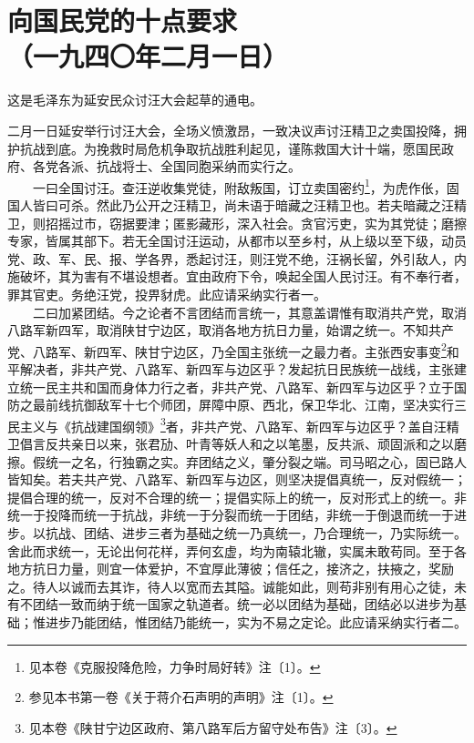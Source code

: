 \documentclass[cn,11pt,chinese]{elegantbook}
\def\myformat#1{\hfil\hfil #1}
\begin{document}
\newpage\section*{\myformat{向国民党的十点要求}\\\myformat{（一九四〇年二月一日）}}
\begin{introduction}\item  这是毛泽东为延安民众讨汪大会起草的通电。\end{introduction}
二月一日延安举行讨汪大会，全场义愤激昂，一致决议声讨汪精卫之卖国投降，拥护抗战到底。为挽救时局危机争取抗战胜利起见，谨陈救国大计十端，愿国民政府、各党各派、抗战将士、全国同胞采纳而实行之。\\
　　一曰全国讨汪。查汪逆收集党徒，附敌叛国，订立卖国密约\footnote[1]{ 见本卷《克服投降危险，力争时局好转》注〔1〕。}，为虎作伥，固国人皆曰可杀。然此乃公开之汪精卫，尚未语于暗藏之汪精卫也。若夫暗藏之汪精卫，则招摇过市，窃据要津；匿影藏形，深入社会。贪官污吏，实为其党徒；磨擦专家，皆属其部下。若无全国讨汪运动，从都市以至乡村，从上级以至下级，动员党、政、军、民、报、学各界，悉起讨汪，则汪党不绝，汪祸长留，外引敌人，内施破坏，其为害有不堪设想者。宜由政府下令，唤起全国人民讨汪。有不奉行者，罪其官吏。务绝汪党，投畀豺虎。此应请采纳实行者一。\\
　　二曰加紧团结。今之论者不言团结而言统一，其意盖谓惟有取消共产党，取消八路军新四军，取消陕甘宁边区，取消各地方抗日力量，始谓之统一。不知共产党、八路军、新四军、陕甘宁边区，乃全国主张统一之最力者。主张西安事变\footnote[2]{ 参见本书第一卷《关于蒋介石声明的声明》注〔1〕。}和平解决者，非共产党、八路军、新四军与边区乎？发起抗日民族统一战线，主张建立统一民主共和国而身体力行之者，非共产党、八路军、新四军与边区乎？立于国防之最前线抗御敌军十七个师团，屏障中原、西北，保卫华北、江南，坚决实行三民主义与《抗战建国纲领》\footnote[3]{ 见本卷《陕甘宁边区政府、第八路军后方留守处布告》注〔3〕。}者，非共产党、八路军、新四军与边区乎？盖自汪精卫倡言反共亲日以来，张君劢、叶青等妖人和之以笔墨，反共派、顽固派和之以磨擦。假统一之名，行独霸之实。弃团结之义，肇分裂之端。司马昭之心，固已路人皆知矣。若夫共产党、八路军、新四军与边区，则坚决提倡真统一，反对假统一；提倡合理的统一，反对不合理的统一；提倡实际上的统一，反对形式上的统一。非统一于投降而统一于抗战，非统一于分裂而统一于团结，非统一于倒退而统一于进步。以抗战、团结、进步三者为基础之统一乃真统一，乃合理统一，乃实际统一。舍此而求统一，无论出何花样，弄何玄虚，均为南辕北辙，实属未敢苟同。至于各地方抗日力量，则宜一体爱护，不宜厚此薄彼；信任之，接济之，扶掖之，奖励之。待人以诚而去其诈，待人以宽而去其隘。诚能如此，则苟非别有用心之徒，未有不团结一致而纳于统一国家之轨道者。统一必以团结为基础，团结必以进步为基础；惟进步乃能团结，惟团结乃能统一，实为不易之定论。此应请采纳实行者二。\\
\end{document}
